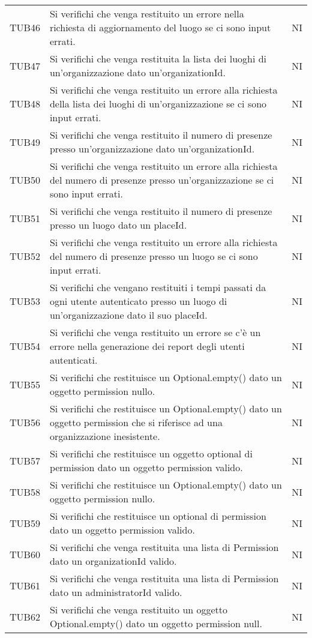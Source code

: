 {\begin{longtable}{ c C{13cm} C{1cm}}
TUB46 & Si verifichi che venga restituito un errore nella richiesta di aggiornamento del luogo se ci sono input errati. & NI \\
TUB47 & Si verifichi che venga restituita la lista dei luoghi di un'organizzazione dato un'organizationId. & NI \\
TUB48 & Si verifichi che venga restituito un errore alla richiesta della lista dei luoghi di un'organizzazione se ci sono input errati. & NI \\
TUB49 & Si verifichi che venga restituito il numero di presenze presso un'organizzazione dato un'organizationId. & NI \\
TUB50 & Si verifichi che venga restituito un errore alla richiesta del numero di presenze presso un'organizzazione se ci sono input errati. & NI \\
TUB51 & Si verifichi che venga restituito il numero di presenze presso un luogo dato un placeId. & NI \\
TUB52 & Si verifichi che venga restituito un errore alla richiesta del numero di presenze presso un luogo se ci sono input errati. & NI \\
TUB53 & Si verifichi che vengano restituiti i tempi passati da ogni utente autenticato presso un luogo di un'organizzazione dato il suo placeId. & NI \\
TUB54 & Si verifichi che venga restituito un errore se c'è un errore nella generazione dei report degli utenti autenticati. & NI \\
TUB55 & Si verifichi che restituisce un Optional.empty() dato un oggetto permission nullo. & NI \\
TUB56 & Si verifichi che restituisce un Optional.empty() dato un oggetto permission che si riferisce ad una organizzazione inesistente. & NI \\
TUB57 & Si verifichi che restituisce un oggetto optional di permission dato un oggetto permission valido. & NI \\
TUB58 & Si verifichi che restituisce un Optional.empty() dato un oggetto permission nullo. & NI \\
TUB59 & Si verifichi che restituisce un optional di permission dato un oggetto permission valido. & NI \\
TUB60 & Si verifichi che venga restituita una lista di Permission dato un organizationId valido. & NI \\
TUB61 & Si verifichi che venga restituita una lista di Permission dato un administratorId valido. & NI \\
TUB62 & Si verifichi che venga restituito un oggetto Optional.empty() dato un oggetto permission null. & NI \\

\end{longtable}}
